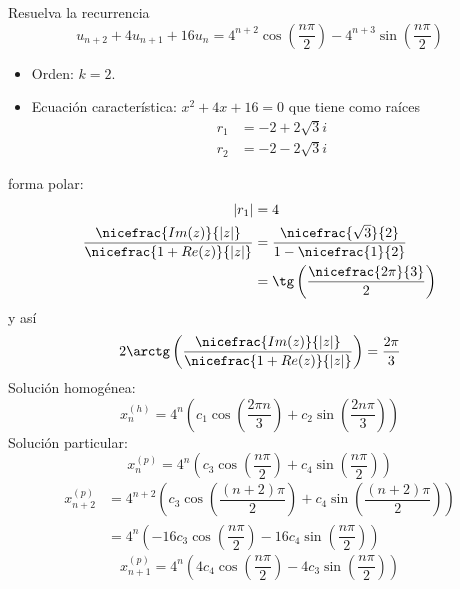 \begin{ejercicio}
    Resuelva la recurrencia
    \begin{equation*}
        u_{n+2} + 4u_{n+1} + 16u_n = 4^{n+2} \cos \left(\dfrac{n\pi}{2} \right) -4^{n+3} \sin \left(\dfrac{n\pi}{2} \right) 
    \end{equation*}

    \begin{itemize}
        \item Orden: $k = 2$.
        \item Ecuación característica: $x^2 + 4x + 16 = 0$ 
            que tiene como raíces
            \begin{align*}
                r_1 &= -2 + 2\sqrt{3}i \\
                r_2 &= -2 -2\sqrt{3}i 
            \end{align*}
    \end{itemize}
    forma polar:
    \begin{align*}
        |r_1| &= 4 \\
        \dfrac{\nicefrac{Im(z)}{|z|}}{\nicefrac{1 + Re(z)}{|z|}} &= \dfrac{\nicefrac{\sqrt{3}}{2}}{1-\nicefrac{1}{2}} \\
                                                                  &= \tg \left(\dfrac{\nicefrac{2\pi}{3}}{2} \right) 
    \end{align*}
    y así 
    \begin{equation*}
        2 \arctg \left(\dfrac{\nicefrac{Im(z)}{|z|}}{\nicefrac{1 + Re(z)}{|z|}}  \right) = \dfrac{2\pi}{3} 
    \end{equation*}
    Solución homogénea:
    \begin{equation*}
        x_n^{(h)} = 4^n \left(c_1 \cos \left(\dfrac{2\pi n}{3}\right) + c_2 \sin \left(\dfrac{2n\pi}{3} \right)  \right) 
    \end{equation*}
    Solución particular:
    \begin{equation*}
        x_n^{(p)} = 4^n \left( c_3 \cos \left(\dfrac{n\pi}{2} \right) + c_4 \sin \left(\dfrac{n\pi}{2} \right)  \right)
    \end{equation*}
    \begin{align*}
        x_{n+2}^{(p)} &= 4^{n+2} \left(c_3 \cos \left(\dfrac{(n+2)\pi}{2}\right) +c_4 \sin \left(\dfrac{(n+2)\pi}{2} \right) \right) \\
                      &= 4^n \left(-16c_3 \cos \left(\dfrac{n\pi}{2} \right)  -16 c_4 \sin \left(\dfrac{n\pi}{2} \right) \right) 
    \end{align*} 
    \begin{equation*}
        x_{n+1}^{(p)} = 4^n \left(4c_4 \cos \left(\dfrac{n\pi}{2} \right) -4 c_3 \sin \left(\dfrac{n\pi}{2} \right) \right) 
    \end{equation*}
\end{ejercicio}
